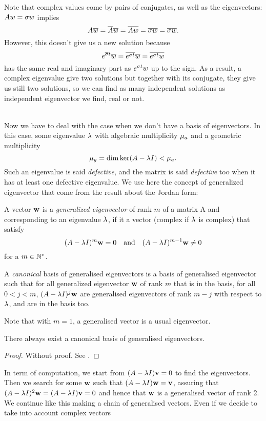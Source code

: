 \begin{remarque}
Note that complex values come by pairs of conjugates, as well as the eigenvectors: \\
$Aw=\sigma w$ implies 
$$A\overline{w} = \overline{A}\overline{w} = \overline{Aw}= \overline{\sigma w} = \overline{\sigma}\overline{w}.$$
However, this doesn't give us a new solution because $$e^{\overline{\sigma} t}\overline{w}= \overline{e^{\sigma t}}\overline{w} = \overline{e^{\sigma t}w}$$
has the same real and imaginary part as $e^{\sigma t}w$ up to the sign. As a result, a complex eigenvalue give two solutions but together with its conjugate, they give us still two solutions, so we can find as many independent solutions as independent eigenvector we find, real or not.
\end{remarque}
\quad \\
Now we have to deal with the case when we don't have a basis of eigenvectors. In this case, some eigenvalue $\lambda$ with algebraic multiplicity $\mu_a$ and a geometric multiplicity
$$\mu_g=\dim\ker(A-\lambda I) < \mu_a.$$
Such an eigenvalue is said \emph{defective}, and the matrix is said \emph{defective} too when it has at least one defective eigenvalue. We use here the concept of generalized eigenvector that come from the result about the Jordan form:

\begin{definition}
    A vector $\mathbf{w}$ is a \emph{generalized eigenvector} of rank $m$  of a matrix A and corresponding to an eigenvalue $\lambda$, if it a vector (complex if $\lambda$ is complex) that satisfy
    $$(A-\lambda I)^m\mathbf{w}=0 \quad\text{and}\quad (A-\lambda I)^{m-1}\mathbf{w}\neq0$$
    for a $m\in\mathbb{N}^*$.
    
    A \emph{canonical} basis of generalised eigenvectors is a basis of generalised eigenvector such that for all generalized eigenvector $\mathbf{w}$ of rank $m$ that is in the basis, for all $0<j<m$, $(A-\lambda I)^j\mathbf{w}$ are generalised eigenvectors of rank $m-j$ with respect to $\lambda$, and are in the basis too.
\end{definition}

Note that with $m=1$, a generalised vector is a usual eigenvector.
    
\begin{theoreme}
    There always exist a canonical basis of generalised eigenvectors.
\end{theoreme}
\begin{proof}
    Without proof. See .
\end{proof}

In term of computation, we start from $(A-\lambda I)\mathbf{v}=0$ to find the eigenvectors. Then we search for some $\mathbf{w}$ such that $(A-\lambda I)\mathbf{w}=\mathbf{v}$, assuring that $(A-\lambda I)^2\mathbf{w}=(A-\lambda I)\mathbf{v}=0$ and hence that $\mathbf{w}$ is a generalised vector of rank 2. We continue like this making a chain of generalised vectors. Even if we decide to take into account complex vectors

